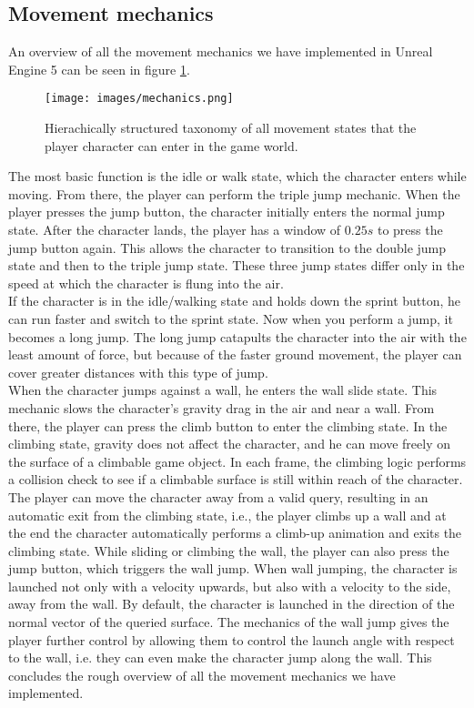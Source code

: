 \documentclass[letterpaper, 10 pt, conference]{ieeeconf}  %
\begin{document}
\subsection{Movement mechanics}

An overview of all the movement mechanics we have implemented in Unreal Engine 5 can be seen in figure \ref{fig:mechanics}.

\begin{figure}[!ht]
    \caption{Hierachically structured taxonomy of all movement states that the player character can enter in the game world.
    }
    \centering
    \texttt{[image: images/mechanics.png]}
    \label{fig:mechanics}
\end{figure}

The most basic function is the idle or walk state, which the character enters while moving.
From there, the player can perform the triple jump mechanic.
When the player presses the jump button, the character initially enters the normal jump state. 
After the character lands, the player has a window of $\textit{0.25s}$ to press the jump button again.
This allows the character to transition to the double jump state and then to the triple jump state.
These three jump states differ only in the speed at which the character is flung into the air. \\
If the character is in the idle/walking state and holds down the sprint button, he can run faster and switch to the sprint state.
Now when you perform a jump, it becomes a long jump.
The long jump catapults the character into the air with the least amount of force, but because of the faster ground movement, the player can cover greater distances with this type of jump. \\
When the character jumps against a wall, he enters the wall slide state. 
This mechanic slows the character's gravity drag in the air and near a wall.
From there, the player can press the climb button to enter the climbing state.
In the climbing state, gravity does not affect the character, and he can move freely on the surface of a climbable game object.
In each frame, the climbing logic performs a collision check to see if a climbable surface is still within reach of the character.
The player can move the character away from a valid query, resulting in an automatic exit from the climbing state, i.e., the player climbs up a wall and at the end the character automatically performs a climb-up animation and exits the climbing state.
While sliding or climbing the wall, the player can also press the jump button, which triggers the wall jump.
When wall jumping, the character is launched not only with a velocity upwards, but also with a velocity to the side, away from the wall.
By default, the character is launched in the direction of the normal vector of the queried surface.
The mechanics of the wall jump gives the player further control by allowing them to control the launch angle with respect to the wall, i.e. they can even make the character jump along the wall.
This concludes the rough overview of all the movement mechanics we have implemented.
\end{document}
